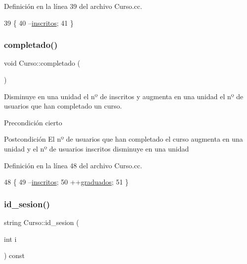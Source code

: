 Definición en la línea 39 del archivo Curso.\+cc.


\begin{DoxyCode}
39                        \{
40         --\mbox{\hyperlink{class_curso_aef03f588dd91d57a6e679d05148fd971}{inscritos}};
41       \}
\end{DoxyCode}
\mbox{\label{class_curso_a832e6ccf726c8534162079e9a041aac9}} 
\subsubsection{\texorpdfstring{completado()}{completado()}}
{\footnotesize\ttfamily void Curso\+::completado (\begin{DoxyParamCaption}{ }\end{DoxyParamCaption})}



Disminuye en una unidad el nº de inscritos y augmenta en una unidad el nº de usuarios que han completado un curso. 

\begin{DoxyPrecond}{Precondición}
cierto 
\end{DoxyPrecond}
\begin{DoxyPostcond}{Postcondición}
El nº de usuarios que han completado el curso augmenta en una unidad y el nº de usuarios inscritos disminuye en una unidad 
\end{DoxyPostcond}


Definición en la línea 48 del archivo Curso.\+cc.


\begin{DoxyCode}
48                              \{
49         --\mbox{\hyperlink{class_curso_aef03f588dd91d57a6e679d05148fd971}{inscritos}};
50         ++\mbox{\hyperlink{class_curso_abf52f538c449c083d4c067a3329c6af2}{graduados}};
51       \}
\end{DoxyCode}
\mbox{\label{class_curso_a176168f881b166e33fa7f8f3abd1d589}} 
\subsubsection{\texorpdfstring{id\+\_\+sesion()}{id\_sesion()}}
{\footnotesize\ttfamily string Curso\+::id\+\_\+sesion (\begin{DoxyParamCaption}\item[{int}]{i }\end{DoxyParamCaption}) const}



